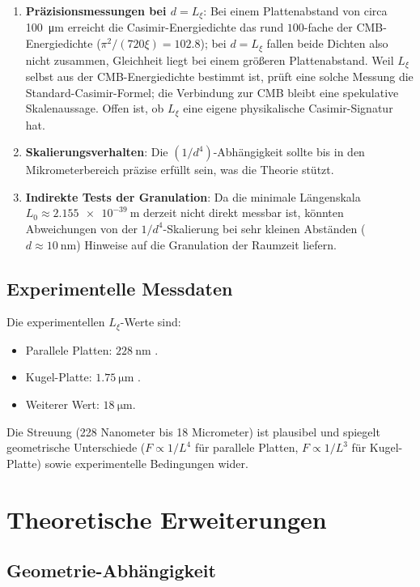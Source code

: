 	\begin{enumerate}
		\item \textbf{Präzisionsmessungen bei \( d = L_\xi \)}: Bei einem Plattenabstand von circa \SI{100}{\micro\meter} erreicht die Casimir-Energiedichte das rund $100$-fache der CMB-Energiedichte ($\pi^2/(720\xi)=102.8$); bei $d=L_\xi$ fallen beide Dichten also nicht zusammen, Gleichheit liegt bei einem größeren Plattenabstand. Weil \( L_\xi \) selbst aus der CMB-Energiedichte bestimmt ist, prüft eine solche Messung die Standard-Casimir-Formel; die Verbindung zur CMB bleibt eine spekulative Skalenaussage. Offen ist, ob \( L_\xi \) eine eigene physikalische Casimir-Signatur hat.
		\item \textbf{Skalierungsverhalten}: Die \( (1/d^4) \)-Abhängigkeit sollte bis in den Mikrometerbereich präzise erfüllt sein, was die Theorie stützt.
		\item \textbf{Indirekte Tests der Granulation}: Da die minimale Längenskala \( L_0 \approx \SI{2.155e-39}{\meter} \) derzeit nicht direkt messbar ist, könnten Abweichungen von der \( 1/d^4 \)-Skalierung bei sehr kleinen Abständen (\( d \approx \SI{10}{\nano\meter} \)) Hinweise auf die Granulation der Raumzeit liefern.
	\end{enumerate}
	
	\subsection{Experimentelle Messdaten}
	
	Die experimentellen \( L_\xi \)-Werte sind:
	\begin{itemize}
		\item Parallele Platten: \( \SI{228}{\nano\meter} \) \cite{dhital2024}.
		\item Kugel-Platte: \( \SI{1.75}{\micro\meter} \) \cite{xu2022}.
		\item Weiterer Wert: \( \SI{18}{\micro\meter} \).
	\end{itemize}
	
	Die Streuung (228 Nanometer bis 18 Micrometer) ist plausibel und spiegelt geometrische Unterschiede (\( F \propto 1/L^4 \) für parallele Platten, \( F \propto 1/L^3 \) für Kugel-Platte) sowie experimentelle Bedingungen wider.
	
	\section{Theoretische Erweiterungen}
	
	\subsection{Geometrie-Abhängigkeit}
	
